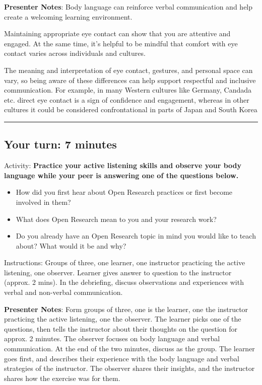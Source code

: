 \documentclass[
  letterpaper,
  DIV=11,
  numbers=noendperiod]{scrartcl}
\begin{document}
\textbf{Presenter Notes}: Body language can reinforce verbal
communication and help create a welcoming learning environment.

Maintaining appropriate eye contact can show that you are attentive and
engaged. At the same time, it's helpful to be mindful that comfort with
eye contact varies across individuals and cultures.

The meaning and interpretation of eye contact, gestures, and personal
space can vary, so being aware of these differences can help support
respectful and inclusive communication. For example, in many Western
cultures like Germany, Candada etc. direct eye contact is a sign of
confidence and engagement, whereas in other cultures it could be
considered confrontational in parts of Japan and South Korea

\begin{center}\rule{0.5\linewidth}{0.5pt}\end{center}

\subsection{Your turn: 7 minutes}\label{your-turn-7-minutes}

Activity: \textbf{Practice your active listening skills and observe your
body language while your peer is answering one of the questions below.}

\begin{itemize}
\item
  How did you first hear about Open Research practices or first become
  involved in them?
\item
  What does Open Research mean to you and your research work?
\item
  Do you already have an Open Research topic in mind you would like to
  teach about? What would it be and why?
\end{itemize}

Instructions: Groups of three, one learner, one instructor practicing
the active listening, one observer. Learner gives answer to question to
the instructor (approx. 2 mins). In the debriefing, discuss observations
and experiences with verbal and non-verbal communication.

\textbf{Presenter Notes}: Form groups of three, one is the learner, one
the instructor practicing the active listening, one the observer. The
learner picks one of the questions, then tells the instructor about
their thoughts on the question for approx. 2 minutes. The observer
focuses on body language and verbal communication. At the end of the two
minutes, discuss as the group. The learner goes first, and describes
their experience with the body language and verbal strategies of the
instructor. The observer shares their insights, and the instructor
shares how the exercise was for them.
\end{document}
